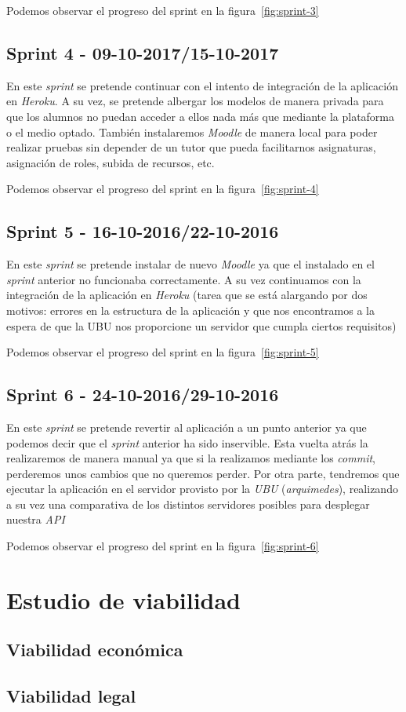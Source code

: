 Podemos observar el progreso del sprint en la figura~\ref{fig:sprint-3}

\subsection{Sprint 4 - 09-10-2017/15-10-2017}
En este \textit{sprint} se pretende continuar con el intento de integración de la aplicación en \textit{Heroku}. A su vez, se pretende albergar los modelos de manera privada para que los alumnos no puedan acceder a ellos nada más que mediante la plataforma o el medio optado. También instalaremos \textit{Moodle} de manera local para poder realizar pruebas sin depender de un tutor que pueda facilitarnos asignaturas, asignación de roles, subida de recursos, etc.

Podemos observar el progreso del sprint en la figura~\ref{fig:sprint-4}

\subsection{Sprint 5 - 16-10-2016/22-10-2016}
En este \textit{sprint} se pretende instalar de nuevo \textit{Moodle} ya que el instalado en el \textit{sprint} anterior no funcionaba correctamente. A su vez continuamos con la integración de la aplicación en \textit{Heroku} (tarea que se está alargando por dos motivos: errores en la estructura de la aplicación y que nos encontramos a la espera de que la UBU nos proporcione un servidor que cumpla ciertos requisitos)

Podemos observar el progreso del sprint en la figura~\ref{fig:sprint-5}

\subsection{Sprint 6 - 24-10-2016/29-10-2016}
En este \textit{sprint} se pretende revertir al aplicación a un punto anterior ya que podemos decir que el \textit{sprint} anterior ha sido inservible. Esta vuelta atrás la realizaremos de manera manual ya que si la realizamos mediante los \textit{commit}, perderemos unos cambios que no queremos perder. Por otra parte, tendremos que ejecutar la aplicación en el servidor provisto por la \textit{UBU} (\textit{arquimedes}), realizando a su vez una comparativa de los distintos servidores posibles para desplegar nuestra \textit{API}

Podemos observar el progreso del sprint en la figura~\ref{fig:sprint-6}


\section{Estudio de viabilidad}

\subsection{Viabilidad económica}

\subsection{Viabilidad legal}


